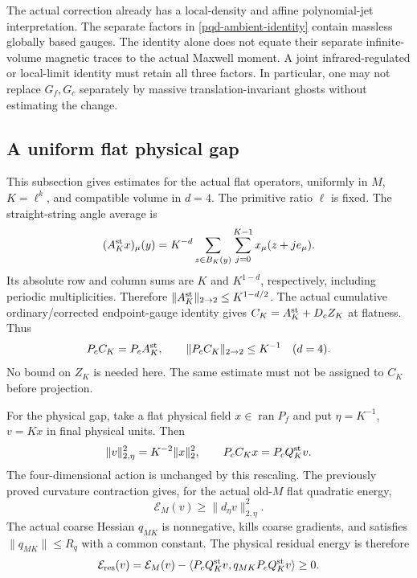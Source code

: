 The actual correction already has a local-density and affine
polynomial-jet interpretation. The separate factors in
\eqref{pqd-ambient-identity} contain massless globally based gauges.
The identity alone does not equate their separate infinite-volume
magnetic traces to the actual Maxwell moment. A joint infrared-regulated
or local-limit identity must retain all three factors. In particular,
one may not replace $G_f,G_c$ separately by massive translation-invariant
ghosts without estimating the change.

\subsection{A uniform flat physical gap}
\label{pqd-flat-section}

This subsection gives estimates for the actual flat operators, uniformly
in $M$, $K=\ell^k$, and compatible volume in $d=4$. The primitive ratio
$\ell$ is fixed. The straight-string angle average is
\begin{equation}
 (A_K^{\rm st}x)_\mu(y)=K^{-d}
 \sum_{z\in B_K(y)}\sum_{j=0}^{K-1}x_\mu(z+je_\mu).
 \label{pqd-angle-average}
\end{equation}
Its absolute row and column sums are $K$ and $K^{1-d}$, respectively,
including periodic multiplicities. Therefore
$\|A_K^{\rm st}\|_{2\to2}\le K^{1-d/2}$.
The actual cumulative ordinary/corrected endpoint-gauge identity gives
$C_K=A_K^{\rm st}+D_c Z_K$ at flatness. Thus
\begin{equation}
 P_cC_K=P_cA_K^{\rm st},\qquad
 \|P_cC_K\|_{2\to2}\le K^{-1}\quad(d=4).
 \label{pqd-projected-bound}
\end{equation}
No bound on $Z_K$ is needed here. The same estimate must not be assigned
to $C_K$ before projection.

For the physical gap, take a flat physical field $x\in\operatorname{ran}P_f$
and put $\eta=K^{-1}$, $v=Kx$ in final physical units. Then
\begin{equation}
 \|v\|_{2,\eta}^2=K^{-2}\|x\|_2^2,\qquad
 P_cC_Kx=P_cQ_K^{\rm st}v.\label{pqd-flat-scaling}
\end{equation}
The four-dimensional action is unchanged by this rescaling. The
previously proved curvature contraction gives, for the actual old-$M$
flat quadratic energy,
\begin{equation}
 \mathcal E_M(v)\ge\|d_\eta v\|_{2,\eta}^2.
 \label{pqd-maxwell-lower}
\end{equation}
The actual coarse Hessian $q_{MK}$ is nonnegative, kills coarse
gradients, and satisfies $\|q_{MK}\|\le R_q$ with a common constant.
The physical residual energy is therefore
\begin{equation}
 \mathcal E_{\rm res}(v)=\mathcal E_M(v)
  -\langle P_cQ_K^{\rm st}v,q_{MK}P_cQ_K^{\rm st}v\rangle\ge0.
 \label{pqd-flat-residual}
\end{equation}

